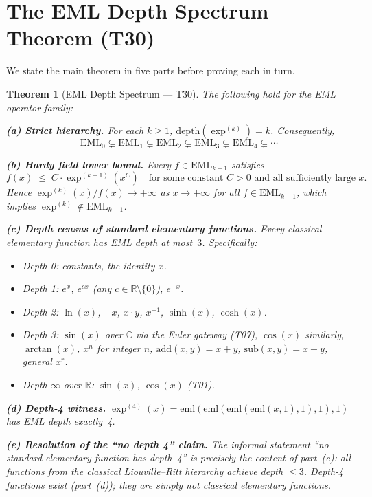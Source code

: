 \documentclass[12pt,a4paper]{article}
\newtheorem{theorem}{Theorem}[section]
\theoremstyle{definition}
\theoremstyle{remark}
\begin{document}
\section{The EML Depth Spectrum Theorem (T30)}

We state the main theorem in five parts before proving each in turn.

\begin{theorem}[EML Depth Spectrum — T30]\label{thm:T30}
The following hold for the EML operator family:

\medskip
\noindent\textbf{(a) Strict hierarchy.}
For each $k\geq 1$, $\mathrm{depth}(\exp^{(k)})=k$.  Consequently,
\[
  \mathrm{EML}_0 \subsetneq \mathrm{EML}_1 \subsetneq \mathrm{EML}_2
  \subsetneq \mathrm{EML}_3 \subsetneq \mathrm{EML}_4 \subsetneq \cdots
\]

\noindent\textbf{(b) Hardy field lower bound.}
Every $f\in\mathrm{EML}_{k-1}$ satisfies
\[
  f(x) \;\leq\; C\cdot\exp^{(k-1)}(x^C)
  \quad\text{for some constant }C>0\text{ and all sufficiently large }x.
\]
Hence $\exp^{(k)}(x)/f(x)\to+\infty$ as $x\to+\infty$ for all
$f\in\mathrm{EML}_{k-1}$, which implies $\exp^{(k)}\notin\mathrm{EML}_{k-1}$.

\noindent\textbf{(c) Depth census of standard elementary functions.}
Every classical elementary function has EML depth at most~$3$.
Specifically:
\begin{itemize}
  \item Depth 0: constants, the identity $x$.
  \item Depth 1: $e^x$, $e^{cx}$ (any $c\in\mathbb{R}\setminus\{0\}$), $e^{-x}$.
  \item Depth 2: $\ln(x)$, $-x$, $x\cdot y$, $x^{-1}$, $\sinh(x)$, $\cosh(x)$.
  \item Depth 3: $\sin(x)$ over $\mathbb{C}$ via the Euler gateway (T07),
        $\cos(x)$ similarly, $\arctan(x)$, $x^n$ for integer $n$,
        $\mathrm{add}(x,y)=x+y$, $\mathrm{sub}(x,y)=x-y$, general $x^r$.
  \item Depth $\infty$ over $\mathbb{R}$: $\sin(x)$, $\cos(x)$ (T01).
\end{itemize}

\noindent\textbf{(d) Depth-4 witness.}
$\exp^{(4)}(x)=\mathrm{eml}(\mathrm{eml}(\mathrm{eml}(\mathrm{eml}(x,1),1),1),1)$
has EML depth exactly~4.

\noindent\textbf{(e) Resolution of the ``no depth 4'' claim.}
The informal statement ``no standard elementary function has depth~4'' is
\emph{precisely} the content of part~(c): all functions from the classical
Liouville--Ritt hierarchy achieve depth $\leq 3$.  Depth-4 functions exist
(part~(d)); they are simply not classical elementary functions.
\end{theorem}
\end{document}
